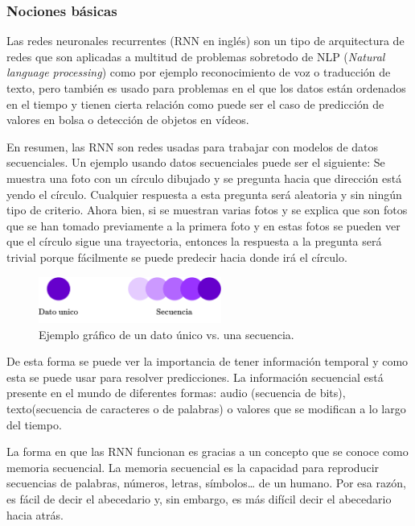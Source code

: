 \subsubsection{Nociones básicas}\label{rnn_theory}
Las redes neuronales recurrentes (RNN en inglés) son un tipo de arquitectura de redes que son aplicadas a multitud de problemas sobretodo de NLP (\textit{Natural language processing}) como por ejemplo reconocimiento de voz o traducción de texto, pero también es usado para problemas en el que los datos están ordenados en el tiempo y tienen cierta relación como puede ser el caso de predicción de valores en bolsa o detección de objetos en vídeos.
\newline

En resumen, las RNN son redes usadas para trabajar con modelos de datos secuenciales. Un ejemplo usando datos secuenciales puede ser el siguiente: Se muestra una foto con un círculo dibujado y se pregunta hacia que dirección está yendo el círculo. Cualquier respuesta a esta pregunta será aleatoria y sin ningún tipo de criterio. Ahora bien, si se muestran varias fotos y se explica que son fotos que se han tomado previamente a la primera foto y en estas fotos se pueden ver que el círculo sigue una trayectoria, entonces la respuesta a la pregunta será trivial porque fácilmente se puede predecir hacia donde irá el círculo.

\begin{figure}[H]
    \centering
    \includegraphics[width=6cm]{images/state-of-art/rnn/ball.png}
    \caption{Ejemplo gráfico de un dato único vs. una secuencia.}
    \label{fig:basic_network}
\end{figure}

De esta forma se puede ver la importancia de tener información temporal y como esta se puede usar para resolver predicciones. La información secuencial está presente en el mundo de diferentes formas: audio (secuencia de bits), texto(secuencia de caracteres o de palabras) o valores que se modifican a lo largo del tiempo.
\newline

La forma en que las RNN funcionan es gracias a un concepto que se conoce como memoria secuencial. La memoria secuencial es la capacidad para reproducir secuencias de palabras, números, letras, símbolos… de un humano. Por esa razón, es fácil de decir el abecedario y, sin embargo, es más difícil decir el abecedario hacia atrás.
\newline

